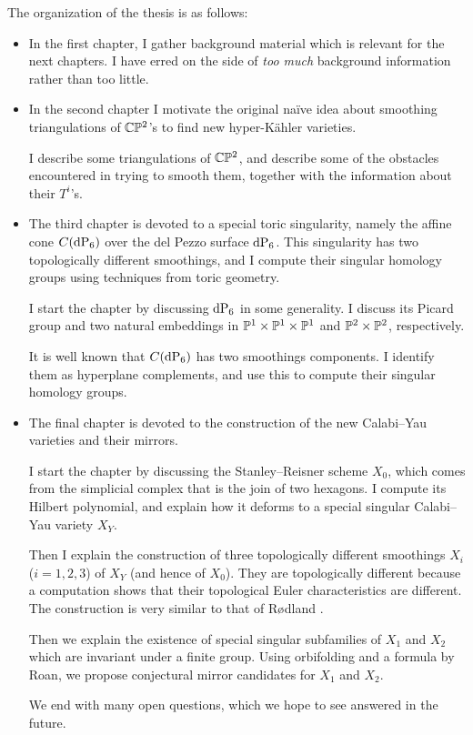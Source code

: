 The organization of the thesis is as follows:

\begin{itemize}
	\item  In the first chapter, I gather background material which is relevant for the next chapters. I have erred on the side of \emph{too much} background information rather than too little. 

\item In the second chapter I motivate the original naïve idea about smoothing triangulations of $\C \P^2$'s to find new hyper-Kähler varieties.

I describe some triangulations of $\C \P^2$, and describe some of the obstacles encountered in trying to smooth them, together with the information about their $T^i$'s.

\item The third chapter is devoted to a special toric singularity, namely the affine cone $C(\dP6)$ over the del Pezzo surface $\dP6$. This singularity has two topologically different smoothings, and I compute their singular homology groups using techniques from toric geometry.

I start the chapter by discussing $\dP6$ in some generality. I discuss its Picard group and two natural embeddings in $\P^1 \times \P^1 \times \P^1$ and $\P^2 \times \P^2$, respectively.

It is well known that $C(\dP6)$ has two smoothings components. I identify them as hyperplane complements, and use this to compute their singular homology groups.

\item The final chapter is devoted to the construction of the new Calabi--Yau varieties and their mirrors.

I start the chapter by discussing the Stanley--Reisner scheme $X_0$, which comes from the simplicial complex that is the join of two hexagons. I compute its Hilbert polynomial, and explain how it deforms to a special singular Calabi--Yau variety $X_Y$.

Then I explain the construction of three topologically different smoothings $X_i$ ($i=1,2,3$) of $X_Y$ (and hence of $X_0$). They are topologically different because a \MM computation shows that their topological Euler characteristics are different. The construction is very similar to that of Rødland \cite{rodland_pfaffian}.

Then we explain the existence of special singular subfamilies of $X_1$ and $X_2$ which are invariant under a finite group. Using orbifolding and a formula by Roan, we propose conjectural mirror candidates for $X_1$ and $X_2$.

We end with many open questions, which we hope to see answered in the future.


\end{itemize}

